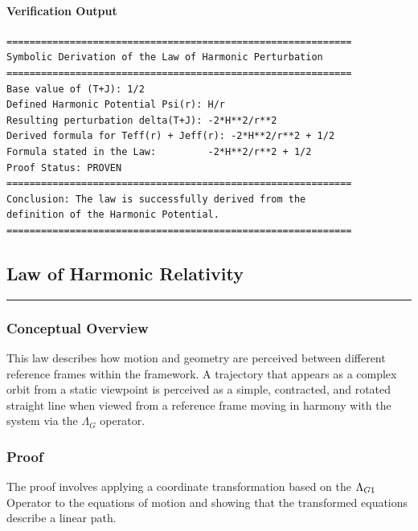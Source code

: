 \paragraph{Verification Output}
\begin{verbatim}
============================================================
Symbolic Derivation of the Law of Harmonic Perturbation
============================================================
Base value of (T+J): 1/2
Defined Harmonic Potential Psi(r): H/r
Resulting perturbation delta(T+J): -2*H**2/r**2
Derived formula for Teff(r) + Jeff(r): -2*H**2/r**2 + 1/2
Formula stated in the Law:         -2*H**2/r**2 + 1/2
Proof Status: PROVEN
============================================================
Conclusion: The law is successfully derived from the
definition of the Harmonic Potential.
============================================================
\end{verbatim}


\subsection*{Law of Harmonic Relativity}
\hrule
\vspace{0.3cm}
\vspace{0.5cm}

\subsubsection*{Conceptual Overview}
This law describes how motion and geometry are perceived between different reference frames within the framework. A trajectory that appears as a complex orbit from a static viewpoint is perceived as a simple, contracted, and rotated straight line when viewed from a reference frame moving in harmony with the system via the $\Lambda_G$ operator.

\subsubsection*{Proof}
The proof involves applying a coordinate transformation based on the $\Lambda_{G1}$ Operator to the equations of motion and showing that the transformed equations describe a linear path.

